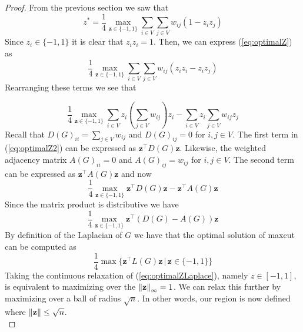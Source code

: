 \documentclass[12pt]{article}
\theoremstyle{plain}
\theoremstyle{definition}
\begin{document}
\begin{proof}
From the previous section we saw that 
\begin{equation}\label{eq:optimalZ}
z^* = \frac{1}{4} \max_{\mathbf{z} \in \lbrace -1,1 \rbrace} \sum_{i \in V} \sum_{j \in V} w_{ij} (1 - z_i z_j) 
\end{equation}
Since $z_i \in \lbrace -1, 1 \rbrace$ it is clear that $z_i z_i = 1$. Then, we can express (\ref{eq:optimalZ}) as
\begin{equation}
\frac{1}{4} \max_{\mathbf{z} \in \lbrace -1,1 \rbrace} \sum_{i \in V} \sum_{j \in V} w_{ij} (z_i z_i - z_i z_j) 
\end{equation}
Rearranging these terms we see that 

\begin{equation}\label{eq:optimalZ2}
\frac{1}{4} \max_{\mathbf{z} \in \lbrace -1,1 \rbrace} \sum_{i \in V} z_i \left(\sum_{j \in V} w_{ij} \right) z_i - \sum_{i \in V} z_i \sum_{j \in V} w_{ij} z_j
\end{equation}
Recall that $D(G)_{ii} = \sum_{j \in V} w_{ij}$ and $D(G)_{ij} = 0$ for $i,j \in V$. The first term in (\ref{eq:optimalZ2}) can be expressed
as $\mathbf{z}^\top D(G) \mathbf{z}$. Likewise, the weighted adjacency matrix $A(G)_{ii} = 0$ and $A(G)_{ij} = w_{ij}$ for
$i,j \in V$. The second term can be expressed as $\mathbf{z}^\top A(G) \mathbf{z}$ and now
\begin{equation}
    \frac{1}{4} \max_{\mathbf{z} \in \lbrace -1, 1 \rbrace} \mathbf{z}^\top D(G) \mathbf{z} - \mathbf{z}^\top A(G) \mathbf{z}
\end{equation}
Since the matrix product is distributive we have
\begin{equation}
     \frac{1}{4} \max_{\mathbf{z} \in \lbrace -1, 1 \rbrace} \mathbf{z}^\top \left( D(G) - A(G) \right) \mathbf{z}
\end{equation}
By definition of the Laplacian of $G$ we have that the optimal solution of maxcut can be computed as
\begin{equation}\label{eq:optimalZLaplace}
    \frac{1}{4} \max \lbrace \mathbf{z}^\top L(G) \mathbf{z} \,|\, \mathbf{z} \in \lbrace -1,1 \rbrace \rbrace
\end{equation}
Taking the continuous relaxation of (\ref{eq:optimalZLaplace}), namely $z \in \left[-1,1 \right]$, is equivalent to maximizing
over the $\left\lVert\mathbf{z}\right\rVert_\infty = 1$. We can relax this further by maximizing over a ball of radius $\sqrt{n}$. In other words,
our region is now defined where $\left\lVert\mathbf{z}\right\rVert \leq \sqrt{n}$. 
\begin{equation}

\end{equation}
\end{proof}
\end{document}
